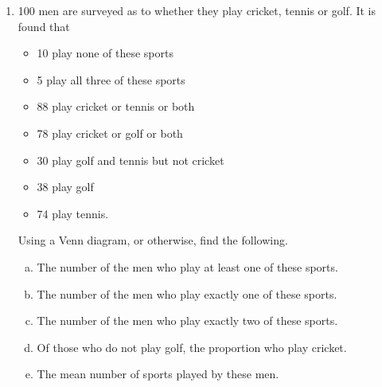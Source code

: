 \documentclass[a4paper,12pt]{article}
\begin{document}

\begin{enumerate}
\item 100 men are surveyed as to whether they play cricket, tennis or golf. It is found that

\begin{multicols}{2}
\begin{itemize}
\item  10 play none of these sports

\item  5 play all three of these sports

\item  88 play cricket or tennis or both

\item  78 play cricket or golf or both

\item  30 play golf and tennis but not cricket

\item  38 play golf

\item  74 play tennis.
\end{itemize}

\end{multicols}
Using a Venn diagram, or otherwise, find the following.

\begin{enumerate}[(a)]

\item The number of the men who play at least one of these sports. 
\item The number of the men who play exactly one of these sports. 
\item The number of the men who play exactly two of these sports. 
\item Of those who do not play golf, the proportion who play cricket. 

\item The mean number of sports played by these men. 

\end{enumerate}





\end{enumerate}
\end{document}
